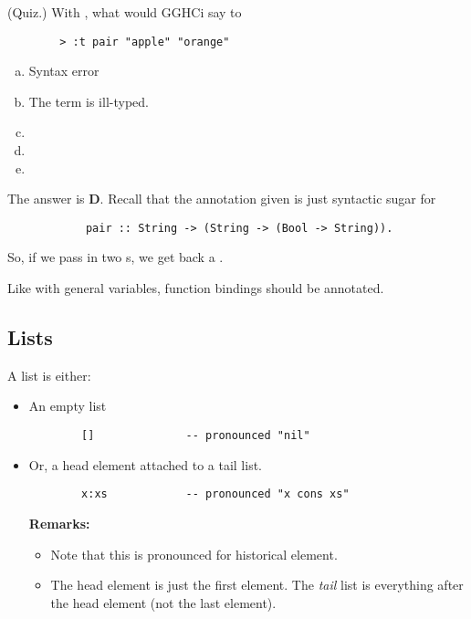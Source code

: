 \documentclass[letterpaper]{article}
\begin{document}
\begin{mdframed}[]
    (Quiz.) With , what would GGHCi say to 
    \begin{verbatim}
        > :t pair "apple" "orange"
    \end{verbatim}

    \begin{enumerate}[(a)]
        \item Syntax error 
        \item The term is ill-typed. 
        \item {}
        \item {}
        \item {}
    \end{enumerate}

    \begin{mdframed}[]
        The answer is \textbf{D}. Recall that the annotation given is just syntactic sugar for 
        \begin{verbatim}
            pair :: String -> (String -> (Bool -> String)).\end{verbatim}
        So, if we pass in two s, we get back a .
    \end{mdframed}
\end{mdframed}

Like with general variables, function bindings should be annotated. 



\subsection{Lists}
A list is either: 
\begin{itemize}
    \item An empty list
    \begin{verbatim}
        []              -- pronounced "nil"\end{verbatim}

    \item Or, a head element attached to a tail list.
    \begin{verbatim}
        x:xs            -- pronounced "x cons xs"\end{verbatim}
    \textbf{Remarks:}
    \begin{itemize}
        \item Note that this is pronounced  for historical element. 
        \item The head element is just the first element. The \emph{tail} list is everything after the head element (not the last element).
    \end{itemize}
\end{itemize}
\end{document}

